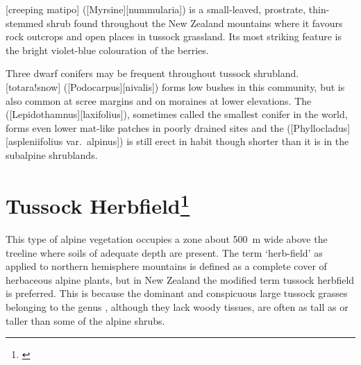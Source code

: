 [creeping matipo] ([Myrsine][nummularia]) is a small-leaved, prostrate, thin-stemmed shrub found throughout the New Zealand mountains where it favours rock outcrops and open places in tussock grassland.
Its most striking feature is the bright violet-blue colouration of the berries.

Three dwarf conifers may be frequent throughout tussock shrubland.
[totara!snow] ([Podocarpus][nivalis]) forms low bushes in this community, but is also common at scree margins and on moraines at lower elevations.
The  ([Lepidothamnus][laxifolius]), sometimes called the smallest conifer in the world, forms even lower mat-like patches in poorly drained sites and the  ([Phyllocladus][aspleniifolius var.\ alpinus]) is still erect in habit though shorter than it is in the subalpine shrublands.

\section[Tussock Herbfield]{Tussock Herbfield\thinspace\footnote{\cite{mark1980progress}}}

This type of alpine vegetation occupies a zone about \SI{500}{\metre} wide above the treeline where soils of adequate depth are present.
The term `herb-field' as applied to northern hemisphere mountains is defined as a complete cover of herbaceous alpine plants, but in New Zealand the modified term tussock herbfield is preferred.
This is because the dominant and conspicuous large tussock grasses belonging to the genus , although they lack woody tissues, are often as tall as or taller than some of the alpine shrubs.

